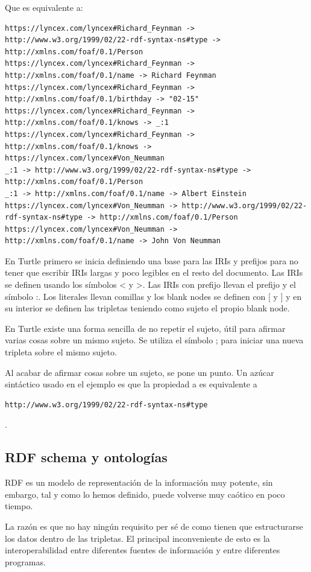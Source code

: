 \documentclass[12pt]{report} %
\begin{document}
Que es equivalente a:
\begin{verbatim}
https://lyncex.com/lyncex#Richard_Feynman -> http://www.w3.org/1999/02/22-rdf-syntax-ns#type -> http://xmlns.com/foaf/0.1/Person
https://lyncex.com/lyncex#Richard_Feynman -> http://xmlns.com/foaf/0.1/name -> Richard Feynman
https://lyncex.com/lyncex#Richard_Feynman -> http://xmlns.com/foaf/0.1/birthday -> "02-15"
https://lyncex.com/lyncex#Richard_Feynman -> http://xmlns.com/foaf/0.1/knows -> _:1
https://lyncex.com/lyncex#Richard_Feynman -> http://xmlns.com/foaf/0.1/knows -> https://lyncex.com/lyncex#Von_Neumman
_:1 -> http://www.w3.org/1999/02/22-rdf-syntax-ns#type -> http://xmlns.com/foaf/0.1/Person
_:1 -> http://xmlns.com/foaf/0.1/name -> Albert Einstein
https://lyncex.com/lyncex#Von_Neumman -> http://www.w3.org/1999/02/22-rdf-syntax-ns#type -> http://xmlns.com/foaf/0.1/Person
https://lyncex.com/lyncex#Von_Neumman -> http://xmlns.com/foaf/0.1/name -> John Von Neumman
\end{verbatim}

En Turtle primero se inicia definiendo una base para las IRIs y prefijos para no tener que escribir IRIs largas y poco legibles en el resto del documento.
Las IRIs se definen usando los símbolos < y >. Las IRIs con prefijo llevan el prefijo y el símbolo :. 
Los literales llevan comillas y los blank nodes se definen con [ y ] y en su interior se definen las tripletas teniendo como sujeto el propio blank node.

En Turtle existe una forma sencilla de no repetir el sujeto, útil para afirmar varias cosas sobre un mismo sujeto. Se utiliza el símbolo ; para iniciar una nueva tripleta sobre el mismo sujeto.

Al acabar de afirmar cosas sobre un sujeto, se pone un punto. Un azúcar sintáctico usado en el ejemplo es que la propiedad a es equivalente a \begin{verbatim}http://www.w3.org/1999/02/22-rdf-syntax-ns#type\end{verbatim}.

\subsection{RDF schema y ontologías}

RDF es un modelo de representación de la información muy potente, sin embargo, tal y como lo hemos definido, puede volverse muy caótico en poco tiempo.

La razón es que no hay ningún requisito per sé de como tienen que estructurarse los datos dentro de las tripletas. El principal inconveniente de esto es la interoperabilidad entre diferentes fuentes de información y entre diferentes programas.
\end{document}

